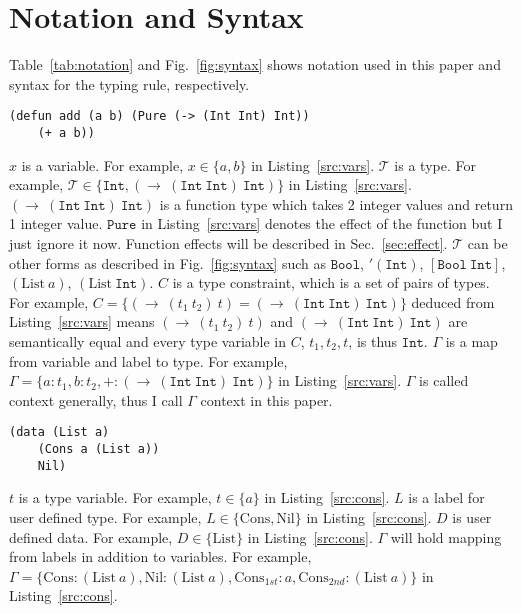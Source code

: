\documentclass{article}
\begin{document}
\section{Notation and Syntax}

Table~\ref{tab:notation} and Fig.~\ref{fig:syntax} shows notation used in this paper
and syntax for the typing rule, respectively.

\begin{lstlisting}[caption=Example of variable and type,label=src:vars]
(defun add (a b) (Pure (-> (Int Int) Int))
    (+ a b))
\end{lstlisting}

$x$ is a variable.
For example, $x \in \{a, b\}$ in Listing~\ref{src:vars}.
$\mathcal{T}$ is a type.
For example, $\mathcal{T} \in \{\mathtt{Int}, (\rightarrow\ (\mathtt{Int}\ \mathtt{Int})\ \mathtt{Int})\}$
in Listing~\ref{src:vars}.
$(\rightarrow\ (\mathtt{Int}\ \mathtt{Int})\ \mathtt{Int})$ is a function type which takes 2 integer values
and return 1 integer value.
$\mathtt{Pure}$ in Listing~\ref{src:vars} denotes the effect of the function but I just ignore it now.
Function effects will be described in Sec.~\ref{sec:effect}.
$\mathcal{T}$ can be other forms as described in Fig.~\ref{fig:syntax} such as
$\mathtt{Bool}$, $'(\mathtt{Int})$, $[\mathtt{Bool}\ \mathtt{Int}]$, $(\mathrm{List}\ a)$, $(\mathrm{List}\ \mathtt{Int})$.
$C$ is a type constraint, which is a set of pairs of types.
For example, $C = \{(\rightarrow\ (t_1\ t_2)\ t) = (\rightarrow\ (\mathtt{Int}\ \mathtt{Int})\ \mathtt{Int})\}$ deduced from
Listing~\ref{src:vars} means $(\rightarrow\ (t_1\ t_2)\ t)$ and $(\rightarrow\ (\mathtt{Int}\ \mathtt{Int})\ \mathtt{Int})$ are
semantically equal and every type variable in $C$, $t_1, t_2, t$, is thus $\mathtt{Int}$.
$\Gamma$ is a map from variable and label to type.
For example, $\Gamma = \{a : t_1, b : t_2, + : (\rightarrow\ (\mathtt{Int}\ \mathtt{Int})\ \mathtt{Int})\}$
in Listing~\ref{src:vars}.
$\Gamma$ is called context generally, thus I call $\Gamma$ context in this paper.

\begin{lstlisting}[caption=Example of user defined data type,label=src:cons]
(data (List a)
    (Cons a (List a))
    Nil)
\end{lstlisting}

$t$ is a type variable.
For example, $t \in \{a\}$ in Listing~\ref{src:cons}.
$L$ is a label for user defined type.
For example, $L \in \{\mathrm{Cons}, \mathrm{Nil}\}$ in Listing~\ref{src:cons}.
$D$ is user defined data.
For example, $D \in \{\mathrm{List}\}$ in Listing~\ref{src:cons}.
$\Gamma$ will hold mapping from labels in addition to variables.
For example,
$\Gamma = \{\mathrm{Cons} : (\mathrm{List}\ a), \mathrm{Nil} : (\mathrm{List}\ a), \mathrm{Cons}_{1st} : a, \mathrm{Cons}_{2nd} : (\mathrm{List}\ a)\}$
in Listing~\ref{src:cons}.
\end{document}
